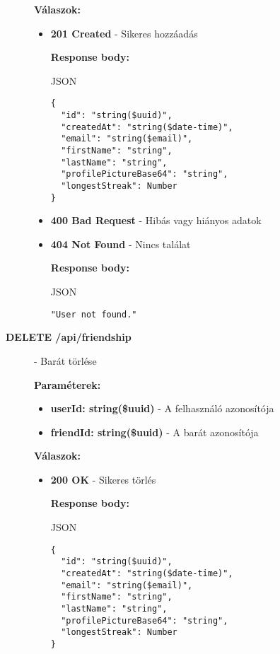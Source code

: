 \documentclass[12pt]{report}
\begin{document}
\begin{description}
    \vspace{0.5cm}
    \textbf{Válaszok:}
    \begin{itemize}
      \item \textbf{201 Created} - Sikeres hozzáadás

        \textbf{Response body:}
        \begin{codeblock}{JSON}
          \begin{verbatim}
{
  "id": "string($uuid)",
  "createdAt": "string($date-time)",
  "email": "string($email)",
  "firstName": "string",
  "lastName": "string",
  "profilePictureBase64": "string",
  "longestStreak": Number
}
          \end{verbatim}
        \end{codeblock}

      \item \textbf{400 Bad Request} - Hibás vagy hiányos adatok
      \item \textbf{404 Not Found} - Nincs találat

        \textbf{Response body:}
        \begin{codeblock}{JSON}
          \begin{verbatim}
"User not found."
          \end{verbatim}
        \end{codeblock}
    \end{itemize}

  \item[\textbf{DELETE /api/friendship}] - Barát törlése
  
    \vspace{0.5cm}
    \textbf{Paraméterek:}
    \begin{itemize}
      \item \textbf{userId: string(\$uuid)} - A felhasználó azonosítója
      \item \textbf{friendId: string(\$uuid)} - A barát azonosítója
    \end{itemize}

    \vspace{0.5cm}
    \textbf{Válaszok:}
    \begin{itemize}
      \item \textbf{200 OK} - Sikeres törlés

        \textbf{Response body:}
        \begin{codeblock}{JSON}
          \begin{verbatim}
{
  "id": "string($uuid)",
  "createdAt": "string($date-time)",
  "email": "string($email)",
  "firstName": "string",
  "lastName": "string",
  "profilePictureBase64": "string",
  "longestStreak": Number
}
          \end{verbatim}
        \end{codeblock}


\end{itemize}
\end{description}
\end{document}
